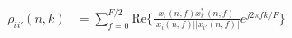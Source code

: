 \documentclass[tikz,convert={outfile=\jobname.svg}]{standalone}
\begin{document}
\begin{align*}
                    \rho_{ii'}(n,k) &= \sum_{f=0}^{F/2} \text{Re}\Bigg\{\frac{x_i(n,f) x_{i'}^*(n,f)}{|x_{i}(n,f)||x_{i'}(n,f)|} e^{j2\pi fk/F}\Bigg\}
\end{align*}
\end{document}
